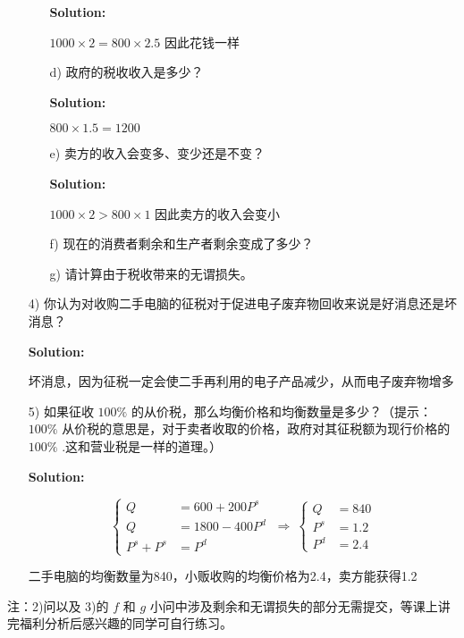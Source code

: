 \documentclass[11pt,a4paper,fleqn]{article}
\begin{document}
\begin{itemize}
\begin{itemize}
		\textbf{Solution:}
	
        $1000\times 2=800\times 2.5$ 因此花钱一样

		\item[d)]政府的税收收入是多少？

		\textbf{Solution:}
	
        $800\times 1.5=1200$
        
		\item[e)]卖方的收入会变多、变少还是不变？

		\textbf{Solution:}
	
        $1000\times 2>800\times 1$ 因此卖方的收入会变小

		\item[f)]现在的消费者剩余和生产者剩余变成了多少？

		\item[g)]请计算由于税收带来的无谓损失。

	\end{itemize}

	\item[4)]你认为对收购二手电脑的征税对于促进电子废弃物回收来说是好消息还是坏消息？

	\textbf{Solution:}
	
    坏消息，因为征税一定会使二手再利用的电子产品减少，从而电子废弃物增多

	\item[5)]如果征收 $100\%$ 的从价税，那么均衡价格和均衡数量是多少？（提示： $100\%$ 从价税的意思是，对于卖者收取的价格，政府对其征税额为现行价格的 $100\%$  .这和营业税是一样的道理。）

	\textbf{Solution:}
	
    $$
		\left\{
		\begin{aligned}
			Q &= 600+200P^s  \\
			Q &= 1800-400P^d \\
			P^s+P^s &= P^d
		\end{aligned}
		\right.
		\ \Longrightarrow\
		\left\{
		\begin{aligned}
            Q&=840\\
			P^s  & =1.2 \\
			P^d   &=2.4 
		\end{aligned}
		\right.
	    $$

        二手电脑的均衡数量为840，小贩收购的均衡价格为2.4，卖方能获得1.2
\end{itemize}

注：2)问以及 3)的 $f$ 和 $g$ 小问中涉及剩余和无谓损失的部分无需提交，等课上讲完福利分析后感兴趣的同学可自行练习。

\clearpage
\end{document}

